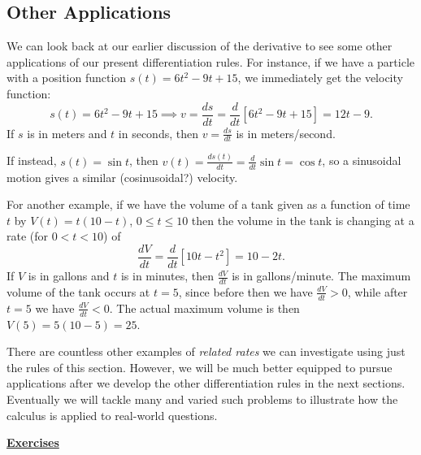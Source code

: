 \subsection{Other Applications}

We can look back at our earlier discussion of the derivative
to see some other applications of our present differentiation
rules.  For instance, if we have a particle with a position
function $s(t)=6t^2-9t+15$, we immediately get the velocity
function:
$$s(t)=6t^2-9t+15\implies v=\frac{ds}{dt}=\frac{d}{dt}\left[
      6t^2-9t+15\right]=12t-9.$$
If $s$ is in meters and $t$ in seconds, then $v=\frac{ds}{dt}$
is in meters/second.

If instead, $s(t)=\sin t$, then $v(t)=\frac{ds(t)}{dt}
=\frac{d}{dt}\sin t=\cos t$, so a sinusoidal motion gives
a similar (cosinusoidal?) velocity.




For another example,
if we have the volume of a tank given as a function of time 
$t$ by $V(t)=t(10-t)$, $0\le t\le 10$ then the volume in the tank is
changing at a rate (for $0<t<10$) of
$$\frac{dV}{dt}=\frac{d}{dt}\left[10t-t^2\right]=10-2t.$$
If $V$ is in gallons and $t$ is in minutes, then
$\frac{dV}{dt}$ is in gallons/minute. The maximum volume of the
tank occurs at $t=5$, since before then we have $\frac{dV}{dt}>0$,
while after $t=5$ we have $\frac{dV}{dt}<0$.  The actual
maximum volume is then $V(5)=5(10-5)=25$.

There are countless other examples of {\it related rates}
we can investigate using just the rules of this section.
However, we will be much better equipped to pursue 
applications after we develop the other differentiation
rules in the next sections.  Eventually we will tackle
many and varied such problems to illustrate how the
calculus is applied to real-world questions.






\newpage
\begin{center}\underline{\Large{\bf Exercises}}\end{center}
\bigskip


